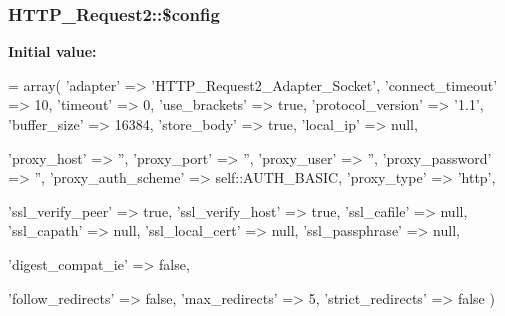 \hypertarget{classHTTP__Request2_a4043f1c6f00d8b92d2b3dcb5ecd2861e}{}
\subsubsection[{\$config}]{\setlength{\rightskip}{0pt plus 5cm}H\+T\+T\+P\+\_\+\+Request2\+::\$config\hspace{0.3cm}{\ttfamily [protected]}}\label{classHTTP__Request2_a4043f1c6f00d8b92d2b3dcb5ecd2861e}
{\bfseries Initial value\+:}
\begin{DoxyCode}
= array(
        \textcolor{stringliteral}{'adapter'}           => \textcolor{stringliteral}{'HTTP\_Request2\_Adapter\_Socket'},
        \textcolor{stringliteral}{'connect\_timeout'}   => 10,
        \textcolor{stringliteral}{'timeout'}           => 0,
        \textcolor{stringliteral}{'use\_brackets'}      => \textcolor{keyword}{true},
        \textcolor{stringliteral}{'protocol\_version'}  => \textcolor{stringliteral}{'1.1'},
        \textcolor{stringliteral}{'buffer\_size'}       => 16384,
        \textcolor{stringliteral}{'store\_body'}        => \textcolor{keyword}{true},
        \textcolor{stringliteral}{'local\_ip'}          => null,

        \textcolor{stringliteral}{'proxy\_host'}        => \textcolor{stringliteral}{''},
        \textcolor{stringliteral}{'proxy\_port'}        => \textcolor{stringliteral}{''},
        \textcolor{stringliteral}{'proxy\_user'}        => \textcolor{stringliteral}{''},
        \textcolor{stringliteral}{'proxy\_password'}    => \textcolor{stringliteral}{''},
        \textcolor{stringliteral}{'proxy\_auth\_scheme'} => self::AUTH\_BASIC,
        \textcolor{stringliteral}{'proxy\_type'}        => \textcolor{stringliteral}{'http'},

        \textcolor{stringliteral}{'ssl\_verify\_peer'}   => \textcolor{keyword}{true},
        \textcolor{stringliteral}{'ssl\_verify\_host'}   => \textcolor{keyword}{true},
        \textcolor{stringliteral}{'ssl\_cafile'}        => null,
        \textcolor{stringliteral}{'ssl\_capath'}        => null,
        \textcolor{stringliteral}{'ssl\_local\_cert'}    => null,
        \textcolor{stringliteral}{'ssl\_passphrase'}    => null,

        \textcolor{stringliteral}{'digest\_compat\_ie'}  => \textcolor{keyword}{false},

        \textcolor{stringliteral}{'follow\_redirects'}  => \textcolor{keyword}{false},
        \textcolor{stringliteral}{'max\_redirects'}     => 5,
        \textcolor{stringliteral}{'strict\_redirects'}  => \textcolor{keyword}{false}
    )
\end{DoxyCode}


